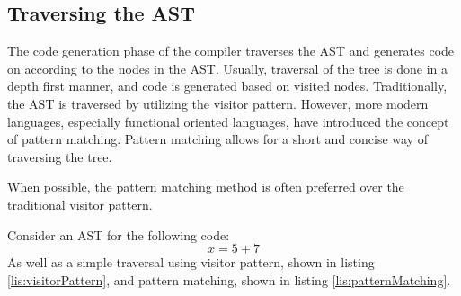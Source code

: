 
\subsection{Traversing the AST}
The code generation phase of the compiler traverses the AST and generates code on according to the nodes in the AST.
Usually, traversal of the tree is done in a depth first manner, and code is generated based on visited nodes.
Traditionally, the AST is traversed by utilizing the visitor pattern. 
However, more modern languages, especially functional oriented languages, have introduced the concept of pattern matching.
Pattern matching allows for a short and concise way of traversing the tree.

When possible, the pattern matching method is often preferred over the traditional visitor pattern. 

Consider an AST for the following code:
$$x = 5 + 7$$
As well as a simple traversal using visitor pattern, shown in listing \ref{lis:visitorPattern}, and pattern matching, shown in listing \ref{lis:patternMatching}.

